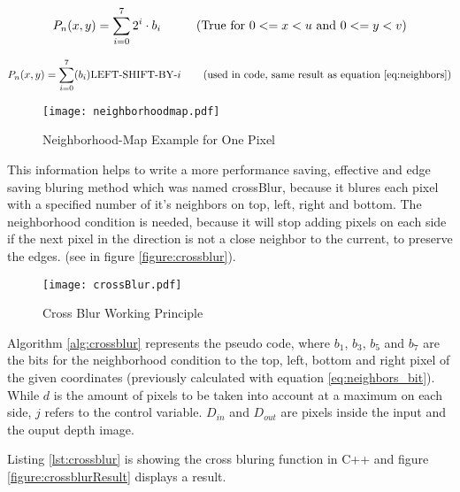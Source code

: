 \begin{equation}
	P_n(x,y)=\sum_{i=0}^7 2^i \cdot b_i \mbox{\hspace{1cm}(True for $0<=x<u$ and $0<=y<v$)}
\label{eq:neighbors} 
\end{equation}

\begin{equation}
	P_n(x,y)=\sum_{i=0}^7 (b_i)\mbox{LEFT-SHIFT-BY-$i$ \hspace{0.5cm} (used in code, same result as equation \ref{eq:neighbors})}
\label{eq:neighbors_cpp} 
\end{equation}
 
 

\begin{figure}[H]
\begin{center}
  \texttt{[image: neighborhoodmap.pdf]}
  \caption{Neighborhood-Map Example for One Pixel}
  \label{figure:neighborhoodmap}
\end{center}
\end{figure}

This information helps to write a more performance saving, effective and edge saving bluring method which 
was named crossBlur, because it blures each pixel with a specified number of it's neighbors on top, left, right and bottom.
The neighborhood condition is needed, because it will stop adding pixels on each side if the next pixel in the direction 
is not a close neighbor to the current, to preserve the edges. (see in figure \vref{figure:crossblur}).

\begin{figure}[H]
\begin{center}
  \texttt{[image: crossBlur.pdf]}
  \caption{Cross Blur Working Principle}
  \label{figure:crossblur}
\end{center}
\end{figure} 



Algorithm \vref{alg:crossblur} represents the pseudo code, where $b_1$, $b_3$, $b_5$
and $b_7$ are the bits for the neighborhood condition to the top, left, bottom and right pixel
of the given coordinates (previously calculated with equation \vref{eq:neighbors_bit}). While
$d$ is the amount of pixels to be taken into account at a maximum on each side, $j$ refers to the control
variable.  $D_{in}$ and $D_{out}$ are pixels inside the input and the ouput depth image.

Listing \vref{lst:crossblur} is showing the cross bluring function in C++ and figure \vref{figure:crossblurResult} 
displays a result.


